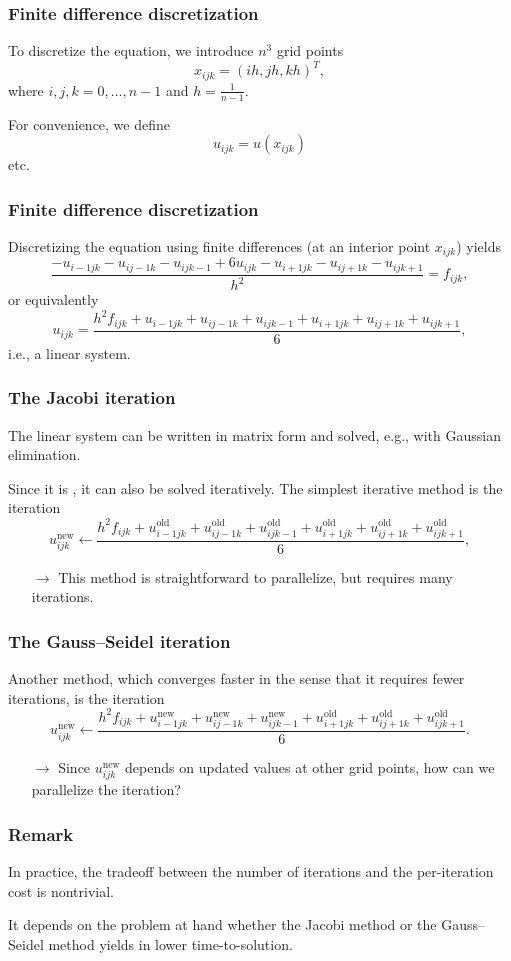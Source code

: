 \documentclass[12pt,t]{beamer}
\let\emph\relax %
\newcommand{\conclude}[1]{%
  \begin{itemize}
    \item[$\rightarrow$]#1
  \end{itemize}
}
\begin{document}
  \begin{frame}[fragile]
    \frametitle{Finite difference discretization}

    To discretize the equation, we introduce $n^3$ grid points
    \[
      x_{ijk}=\left(ih,jh,kh\right)^T,
    \]
    where $i,j,k=0,\ldots,n-1$ and $h=\frac 1{n-1}$.

    For convenience, we define
    \[
      u_{ijk}=u(x_{ijk})
    \]
    etc.
  \end{frame}

  \begin{frame}[fragile]
    \frametitle{Finite difference discretization}

    Discretizing the equation using finite differences (at an interior point $x_{ijk}$) yields
    \[
      \frac{-u_{i-1jk} - u_{ij-1k} - u_{ijk-1} + 6u_{ijk} - u_{i+1jk} - u_{ij+1k} - u_{ijk+1}}{h^2}=f_{ijk},
    \]
    or equivalently
    \[
      u_{ijk}=\frac{h^2f_{ijk} + u_{i-1jk} + u_{ij-1k} + u_{ijk-1} + u_{i+1jk} + u_{ij+1k} + u_{ijk+1}}6,
    \]
    i.e., a linear system.
  \end{frame}

  \begin{frame}[fragile]
    \frametitle{The Jacobi iteration}

    The linear system can be written in matrix form and solved, e.g., with Gaussian elimination.

    Since it is \emph{sparse}, it can also be solved iteratively.
    The simplest iterative method is the \emph{Jacobi} iteration
    \[
      u_{ijk}^\text{new}\leftarrow\frac{h^2f_{ijk} + u_{i-1jk}^\text{old} + u_{ij-1k}^\text{old} + u_{ijk-1}^\text{old} + u_{i+1jk}^\text{old} + u_{ij+1k}^\text{old} + u_{ijk+1}^\text{old}}6,
    \]
    \conclude{This method is straightforward to parallelize, but requires many iterations.}
  \end{frame}

  \begin{frame}[fragile]
    \frametitle{The Gauss--Seidel iteration}

    Another method, which converges faster in the sense that it requires fewer iterations, is the \emph{Gauss--Seidel} iteration
    \[
      u_{ijk}^\text{new}\leftarrow\frac{h^2f_{ijk} + u_{i-1jk}^\text{new} + u_{ij-1k}^\text{new} + u_{ijk-1}^\text{new} + u_{i+1jk}^\text{old} + u_{ij+1k}^\text{old} + u_{ijk+1}^\text{old}}6.
    \]
    \conclude{Since $u_{ijk}^\text{new}$ depends on updated values at other grid points, how can we parallelize the iteration?}
  \end{frame}

  \begin{frame}[fragile]
    \frametitle{Remark}

    In practice, the tradeoff between the number of iterations and the per-iteration cost is nontrivial.

    It depends on the problem at hand whether the Jacobi method or the Gauss--Seidel method yields in lower time-to-solution.
  \end{frame}
\end{document}
